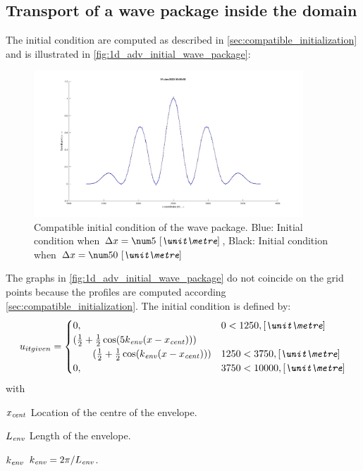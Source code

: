 \subsection{Transport of a wave package inside the domain}
The initial condition are computed as described in \autoref{sec:compatible_initialization}
and is illustrated in \autoref{fig:1d_adv_initial_wave_package}:
\begin{figure}[H]
    \centering
    \includegraphics[width=0.9\textwidth]{figures/wave_package_000s.png}
    \caption{Compatible initial condition of the wave package. Blue: Initial condition when  $\Dx=\bqty{5}{\metre}$, Black: Initial condition when  $\Dx=\bqty{50}{\metre}$}
    \label{fig:1d_adv_initial_wave_package}
\end{figure}
The graphs in \autoref{fig:1d_adv_initial_wave_package} do not coincide on the grid points because the profiles are computed according \autoref{sec:compatible_initialization}.
The initial condition is defined by:
\begin{align}
    u_{it given} =
    \begin{cases}
        0, & 0 < 1250, \bunit{\metre} \\
        (\half + \half \cos( 5k_{\it env}(x - x_{\it cent})) ) \\
        \qquad(\half + \half \cos( k_{\it env} (x - x_{\it cent})) )
        & 1250 < 3750,  \bunit{\metre}
        \\
        0,  & 3750 < 10000,  \bunit{\metre}
    \end{cases}
\end{align}
with
\begin{symbollist}
    \item[$x_{\it cent}$] Location of the centre of the envelope.
    \item[$L_{\it env}$] Length of the envelope.
    \item[$k_{\it env}$] $k_{\it env} = 2\pi / L_{\it env}$.
\end{symbollist}

